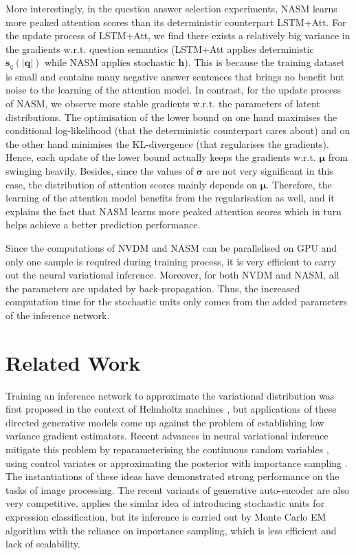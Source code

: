 \documentclass{article}
\newcommand{\tmmathbf}[1]{\ensuremath{\boldsymbol{#1}}}
\begin{document}
More interestingly, in the question answer selection experiments, NASM learns more peaked attention scores than its deterministic counterpart LSTM+Att. 
For the update process of LSTM+Att, we find there exists a relatively big variance in the gradients w.r.t. question semantics (LSTM+Att applies deterministic $\tmmathbf{s}_q(|\tmmathbf{q}|)$ while NASM applies stochastic $\tmmathbf{h}$). This is because the training dataset is small and contains many negative answer sentences that brings no benefit but noise to the learning of the attention model.
In contrast, for the update process of NASM, we observe more stable gradients w.r.t. the parameters of latent distributions. 
The optimisation of the lower bound on one hand maximises the conditional log-likelihood (that the deterministic counterpart cares about) and on the other hand minimises the KL-divergence (that regularises the gradients). 
Hence, each update of the lower bound actually keeps the gradients w.r.t. $\tmmathbf{\mu}$ from swinging heavily.
Besides, since the values of $\tmmathbf{\sigma}$ are not very significant in this case, the distribution of attention scores mainly depends on $\tmmathbf{\mu}$. Therefore, the learning of the attention model benefits from the regularisation as well, and it explains the fact that NASM learns more peaked attention scores which in turn helps achieve a better prediction performance.


Since the computations of NVDM and NASM can be parallelised on GPU and only one sample is required during training process, it is very efficient to carry out the neural variational inference. Moreover, for both NVDM and NASM, all the parameters are updated by back-propagation. Thus, the increased computation time for the stochastic units only comes from the added parameters of the inference network.

\section{Related Work}
Training an inference network to approximate the variational distribution was first proposed in the context of Helmholtz machines \citep{hinton1994autoencoders,hinton1995wake,dayan1996varieties}, but applications of these directed generative models come up against the problem of establishing low variance gradient estimators. 
Recent advances in neural variational inference mitigate this problem by reparameterising the continuous random variables \citep{rezende2014stochastic,kingma2013auto}, using control variates \citep{mnih2014neural} or approximating the posterior with importance sampling \citep{bornschein2014reweighted}.  
The instantiations of these ideas \citep{gregor2015draw,kingma2014semi,ba2015learning} have demonstrated strong performance on the tasks of image processing. The recent variants of generative auto-encoder 
\citep{louizos2015variational,DBLP:journals/corr/MakhzaniSJG15} are also very competitive. 
\citet{tang2013learning} applies the similar idea of introducing stochastic units for expression classification, but its inference is carried out by Monte Carlo EM algorithm with the reliance on importance sampling, which is less efficient and lack of scalability.
\end{document}
